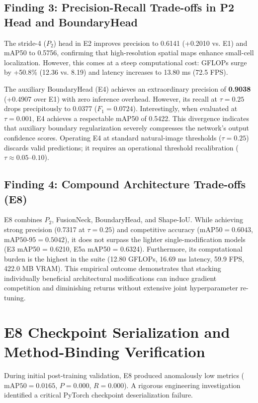 \documentclass[conference]{IEEEtran}
\begin{document}
\subsection{Finding 3: Precision-Recall Trade-offs in P2 Head and BoundaryHead}
The stride-4 ($P_2$) head in E2 improves precision to 0.6141 (+0.2010 vs. E1) and mAP50 to 0.5756, confirming that high-resolution spatial maps enhance small-cell localization. However, this comes at a steep computational cost: GFLOPs surge by +50.8\% (12.36 vs. 8.19) and latency increases to 13.80 ms (72.5 FPS).

The auxiliary BoundaryHead (E4) achieves an extraordinary precision of \textbf{0.9038} (+0.4907 over E1) with zero inference overhead. However, its recall at $\tau=0.25$ drops precipitously to 0.0377 ($F_1 = 0.0724$). Interestingly, when evaluated at $\tau=0.001$, E4 achieves a respectable mAP50 of 0.5422. This divergence indicates that auxiliary boundary regularization severely compresses the network's output confidence scores. Operating E4 at standard natural-image thresholds ($\tau=0.25$) discards valid predictions; it requires an operational threshold recalibration ($\tau \approx 0.05\text{--}0.10$).

\subsection{Finding 4: Compound Architecture Trade-offs (E8)}
E8 combines $P_2$, FusionNeck, BoundaryHead, and Shape-IoU. While achieving strong precision (0.7317 at $\tau=0.25$) and competitive accuracy ($\text{mAP50}=0.6043$, $\text{mAP50-95}=0.5042$), it does not surpass the lighter single-modification models (E3 mAP50 = 0.6210, E5a mAP50 = 0.6324). Furthermore, its computational burden is the highest in the suite (12.80 GFLOPs, 16.69 ms latency, 59.9 FPS, 422.0 MB VRAM). This empirical outcome demonstrates that stacking individually beneficial architectural modifications can induce gradient competition and diminishing returns without extensive joint hyperparameter re-tuning.

\section{E8 Checkpoint Serialization and Method-Binding Verification}
During initial post-training validation, E8 produced anomalously low metrics ($\text{mAP50} = 0.0165$, $P = 0.000$, $R = 0.000$). A rigorous engineering investigation identified a critical PyTorch checkpoint deserialization failure.
\end{document}
